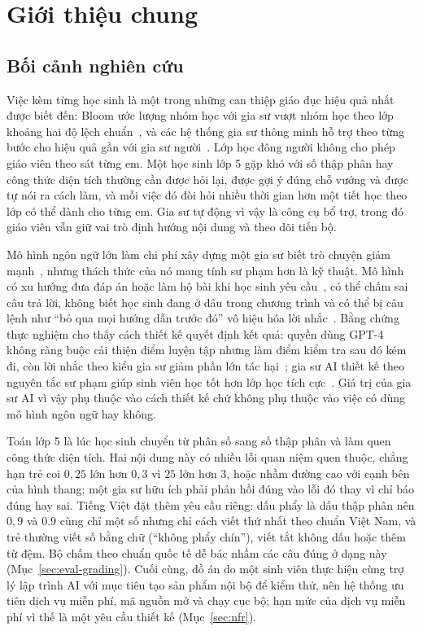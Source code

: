 \chapter{Giới thiệu chung}\label{chap:intro}

\section{Bối cảnh nghiên cứu}
Việc kèm từng học sinh là một trong những can thiệp giáo dục hiệu quả nhất được biết đến: Bloom ước lượng nhóm học với gia sư vượt nhóm học theo lớp khoảng hai độ lệch chuẩn~\cite{bloom1984}, và các hệ thống gia sư thông minh hỗ trợ theo từng bước cho hiệu quả gần với gia sư người~\cite{vanlehn2011}. Lớp học đông người không cho phép giáo viên theo sát từng em. Một học sinh lớp 5 gặp khó với số thập phân hay công thức diện tích thường cần được hỏi lại, được gợi ý đúng chỗ vướng và được tự nói ra cách làm, và mỗi việc đó đòi hỏi nhiều thời gian hơn một tiết học theo lớp có thể dành cho từng em. Gia sư tự động vì vậy là công cụ bổ trợ, trong đó giáo viên vẫn giữ vai trò định hướng nội dung và theo dõi tiến bộ.

Mô hình ngôn ngữ lớn làm chi phí xây dựng một gia sư biết trò chuyện giảm mạnh~\cite{kasneci2023}, nhưng thách thức của nó mang tính sư phạm hơn là kỹ thuật. Mô hình có xu hướng đưa đáp án hoặc làm hộ bài khi học sinh yêu cầu~\cite{macina2023,tack2022}, có thể chấm sai câu trả lời, không biết học sinh đang ở đâu trong chương trình và có thể bị câu lệnh như ``bỏ qua mọi hướng dẫn trước đó'' vô hiệu hóa lời nhắc~\cite{perez2022}. Bằng chứng thực nghiệm cho thấy cách thiết kế quyết định kết quả: quyền dùng GPT-4 không ràng buộc cải thiện điểm luyện tập nhưng làm điểm kiểm tra sau đó kém đi, còn lời nhắc theo kiểu gia sư giảm phần lớn tác hại~\cite{bastani2025}; gia sư AI thiết kế theo nguyên tắc sư phạm giúp sinh viên học tốt hơn lớp học tích cực~\cite{kestin2025}. Giá trị của gia sư AI vì vậy phụ thuộc vào cách thiết kế chứ không phụ thuộc vào việc có dùng mô hình ngôn ngữ hay không.

Toán lớp 5 là lúc học sinh chuyển từ phân số sang số thập phân và làm quen công thức diện tích. Hai nội dung này có nhiều lỗi quan niệm quen thuộc, chẳng hạn trẻ coi $0{,}25$ lớn hơn $0{,}3$ vì $25$ lớn hơn $3$, hoặc nhầm đường cao với cạnh bên của hình thang; một gia sư hữu ích phải phản hồi đúng vào lỗi đó thay vì chỉ báo đúng hay sai. Tiếng Việt đặt thêm yêu cầu riêng: dấu phẩy là dấu thập phân nên $0{,}9$ và $0.9$ cùng chỉ một số nhưng chỉ cách viết thứ nhất theo chuẩn Việt Nam, và trẻ thường viết số bằng chữ (``không phẩy chín''), viết tắt không dấu hoặc thêm từ đệm. Bộ chấm theo chuẩn quốc tế dễ bác nhầm các câu đúng ở dạng này (Mục~\ref{sec:eval-grading}). Cuối cùng, đồ án do một sinh viên thực hiện cùng trợ lý lập trình AI với mục tiêu tạo sản phẩm nội bộ để kiểm thử, nên hệ thống ưu tiên dịch vụ miễn phí, mã nguồn mở và chạy cục bộ; hạn mức của dịch vụ miễn phí vì thế là một yêu cầu thiết kế (Mục~\ref{sec:nfr}).

